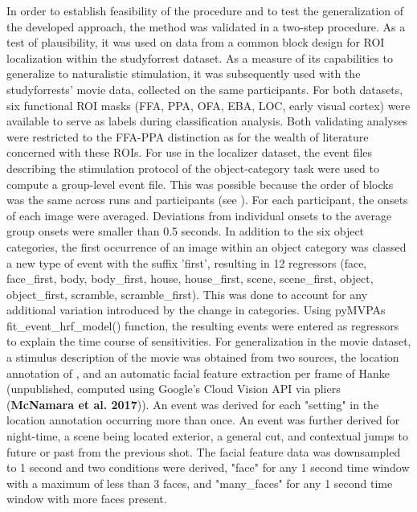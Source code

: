\documentclass[a4paper, 12pt]{scrreprt}
\begin{document}
{In order to establish feasibility of the procedure and to test the generalization of the developed approach, the method was validated in a two-step procedure. As a test of plausibility, it was used on data from a common block design for ROI localization within the studyforrest dataset. As a measure of its capabilities to generalize to naturalistic stimulation, it was subsequently used with the studyforrests' movie data, collected on the same participants. For both datasets, six functional ROI masks (FFA, PPA, OFA, EBA, LOC, early visual cortex) were available to serve as labels during classification analysis. Both validating analyses were restricted to the FFA-PPA distinction as for the wealth of literature concerned with these ROIs. \newline
For use in the localizer dataset, the event files describing the stimulation protocol of the object-category task were used to compute a group-level event file. This was possible because the order of blocks was the same across runs and participants (see \cite{sengupta2016studyforrest}). For each participant, the onsets of each image were averaged. Deviations from individual onsets to the average group onsets were smaller than 0.5 seconds. In addition to the six object categories, the first occurrence of an image within an object category was classed a new type of event with the suffix 'first', resulting in 12 regressors (face, face\_first, body, body\_first, house, house\_first, scene, scene\_first, object, object\_first, scramble, scramble\_first). This was done to account for any additional variation introduced by the change in categories. Using pyMVPAs fit\_event\_hrf\_model() function, the resulting events were entered as regressors to explain the time course of sensitivities. \newline
For generalization in the movie dataset, a stimulus description of the movie was obtained from two sources, the location annotation of \textcite{hausler2016annotation}, and an automatic facial feature extraction per frame of Hanke (unpublished, computed using Google's Cloud Vision API via pliers (\textbf{McNamara et al. 2017})). An event was derived for each "setting" in the location annotation occurring more than once. An event was further derived for night-time, a scene being located exterior, a general cut, and contextual jumps to future or past from the previous shot. The facial feature data was downsampled to 1 second and two conditions were derived, "face" for any 1 second time window with a maximum of less than 3 faces, and "many\_faces" for any 1 second time window with more faces present.

}
\end{document}
